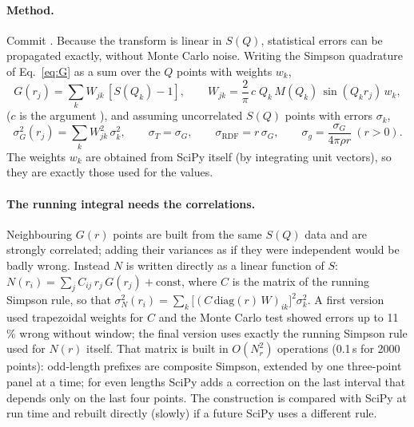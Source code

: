 \documentclass[11pt,a4paper]{article}
\begin{document}
\label{sec:errors}

\paragraph{Method.} Commit . Because the transform is linear
in $S(Q)$, statistical errors can be propagated exactly, without Monte
Carlo noise. Writing the Simpson quadrature of Eq.~\eqref{eq:G} as a sum
over the $Q$ points with weights $w_k$,
\begin{equation}
  G(r_j) = \sum_k W_{jk}\,[S(Q_k)-1], \qquad
  W_{jk} = \frac{2}{\pi}\,c\;Q_k\,M(Q_k)\,\sin(Q_k r_j)\,w_k ,
\end{equation}
($c$ is the argument ), and assuming uncorrelated $S(Q)$ points
with errors $\sigma_k$,
\begin{equation}
  \sigma_G^2(r_j) = \sum_k W_{jk}^2\,\sigma_k^2,\qquad
  \sigma_T = \sigma_G,\qquad
  \sigma_\mathrm{RDF} = r\,\sigma_G,\qquad
  \sigma_g = \frac{\sigma_G}{4\pi\rho r}\ (r>0).
\end{equation}
The weights $w_k$ are obtained from SciPy itself (by integrating unit
vectors), so they are exactly those used for the values.

\paragraph{The running integral needs the correlations.} Neighbouring
$G(r)$ points are built from the same $S(Q)$ data and are strongly
correlated; adding their variances as if they were independent would be
badly wrong. Instead $N$ is written directly as a linear function of $S$:
$N(r_i) = \sum_j C_{ij}\, r_j\, G(r_j) + \text{const}$, where $C$ is the
matrix of the running Simpson rule, so that
$\sigma_N^2(r_i) = \sum_k \bigl[(C\,\mathrm{diag}(r)\,W)_{ik}\bigr]^2 \sigma_k^2$.
A first version used trapezoidal weights for $C$ and the Monte Carlo test
showed errors up to 11\,\% wrong without window; the final version uses
exactly the running Simpson rule used for $N(r)$ itself. That matrix is
built in $O(N_r^2)$ operations (0.1\,s for 2000 points): odd-length
prefixes are composite Simpson, extended by one three-point panel at a
time; for even lengths SciPy adds a correction on the last interval that
depends only on the last four points. The construction is compared with
SciPy at run time and rebuilt directly (slowly) if a future SciPy uses a
different rule.
\end{document}
